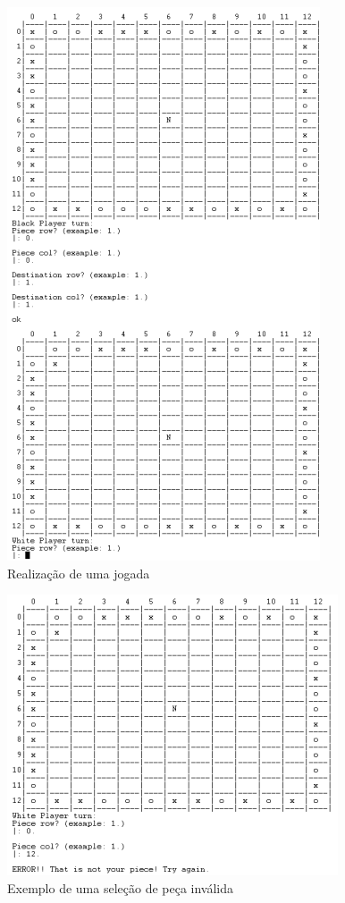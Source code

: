 \documentclass[a4paper]{article}
\begin{document}
\begin{figure}[h!]
\begin{center}
\hspace*{-0.5cm}\includegraphics[scale=1]{game1.png}
\caption{Realização de uma jogada}
\end{center}
\end{figure}

\begin{figure}
\begin{center}
\hspace*{-0.5cm}\includegraphics[scale=1]{game2.png}
\caption{Exemplo de uma seleção de peça inválida}
\end{center}
\end{figure}
\end{document}
